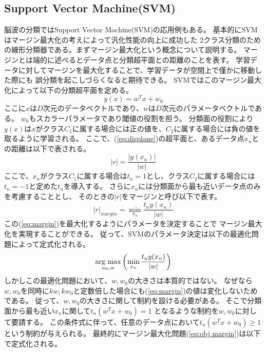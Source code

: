 \subsection{\rm Support Vector Machine(SVM)}
脳波の分類ではSupport Vector Machine(SVM)の応用例もある。
基本的にSVMはマージン最大化の考えによって汎化性能の向上に成功した
2クラス分類のための線形分類器である。まずマージン最大化という概念について説明する。
マージンとは端的に述べるとデータ点と分類超平面との距離のことを表す。
学習データに対してマージンを最大化することで、学習データが空間上で僅かに移動した際にも
誤分類を起こしづらくなると期待できる。
SVMではこのマージン最大化によって以下の分類超平面を定める。
\begin{equation}
    y(x) = w^Tx + w_0
    \label{eq:displane}
\end{equation}
ここに\(x\)は\(D\)次元のデータベクトルであり、\(w\)は\(D\)次元のパラメータベクトルである。
\(w_0\)もスカラーパラメータであり閾値の役割を担う。
分類面の役割により\(y(x)\)は\(x\)がクラス\(C_1\)に属する場合には正の値を、\(C_2\)に属する場合には負の値を取るように学習される。
ここで、(\ref{eq:displane})の超平面と、あるデータ点\(x_n\)との距離は以下で表される。
\begin{equation}
    |r| = \frac{|y(x_n)|}{|w|}
    \label{eq:distance}
\end{equation}
ここで、\(x_n\)がクラス\(C_1\)に属する場合は\(t_n=1\)とし、クラス\(C_2\)に属する場合には
\(t_n=-1\)と定めた\(t_n\)を導入する。
さらに\(x_n\)には分類面から最も近いデータ点のみを考慮することとし、
そのときの\(|r|\)をマージンと呼び以下で表す。
\begin{equation}
    |r|_{margin} = \min_{x_n}\frac{t_ny(x_n)}{|w|}
    \label{eq:margin}
\end{equation}
この(\ref{eq:margin})を最大化するようにパラメータを決定することで
マージン最大化を実現することができる。
従って、SVMのパラメータ決定は以下の最適化問題によって定式化される。
\begin{equation}
    \mathop{\rm arg~max}\limits_{w_0,w}\left(\min_{x_n}\frac{t_ny(x_n)}{|w|}\right)
    \label{eq:obj margin}
\end{equation}
しかしこの最適化問題において、\(w,w_0\)の大きさは本質的ではない。
なぜなら\(w,w_0\)を同時に\(kw,kw_0\)と定数倍した場合にも(\ref{eq:margin})の値は変化しないためである。
従って、\(w,w_0\)の大きさに関して制約を設ける必要がある。
そこで分類面から最も近い\(x_n\)に関して\(t_n(w^Tx+w_0)=1\)
となるような制約を\(w,w_0\)に対して要請する。
この条件式に伴って、任意のデータ点において\(t_n(w^Tx+w_0) \geq 1 \)という制約が与えられる。
最終的にマージン最大化問題(\ref{eq:obj margin})は以下で定式化される。
